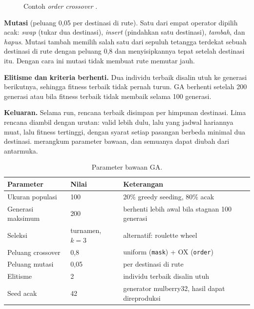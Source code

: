 \begin{figure}[H]
\centering
{}
\caption{Contoh \textit{order crossover} \cite{davis1985}.}
\label{fig:ox}
\end{figure}

\textbf{Mutasi} (peluang 0,05 per destinasi di rute). Satu dari empat operator dipilih acak: \textit{swap} (tukar dua destinasi), \textit{insert} (pindahkan satu destinasi), \textit{tambah}, dan \textit{hapus}. Mutasi tambah memilih salah satu dari sepuluh tetangga terdekat sebuah destinasi di rute dengan peluang 0,8 dan menyisipkannya tepat setelah destinasi itu. Dengan cara ini mutasi tidak membuat rute memutar jauh.

\textbf{Elitisme dan kriteria berhenti.} Dua individu terbaik disalin utuh ke generasi berikutnya, sehingga fitness terbaik tidak pernah turun. GA berhenti setelah 200 generasi atau bila fitness terbaik tidak membaik selama 100 generasi.

\textbf{Keluaran.} Selama run, rencana terbaik disimpan per himpunan destinasi. Lima rencana diambil dengan urutan: valid lebih dulu, lalu yang jadwal hariannya muat, lalu fitness tertinggi, dengan syarat setiap pasangan berbeda minimal dua destinasi.  merangkum parameter bawaan, dan semuanya dapat diubah dari antarmuka.

\begin{table}[H]
\centering
\caption{Parameter bawaan GA.}
\label{tab:parameter}
\small
\begin{tabular}{@{}l l l@{}}
\toprule
\textbf{Parameter} & \textbf{Nilai} & \textbf{Keterangan} \\
\midrule
Ukuran populasi & 100 & 20\% greedy seeding, 80\% acak \\
Generasi maksimum & 200 & berhenti lebih awal bila stagnan 100 generasi \\
Seleksi & turnamen, $k = 3$ & alternatif: roulette wheel \\
Peluang crossover & 0,8 & uniform (\texttt{mask}) + OX (\texttt{order}) \\
Peluang mutasi & 0,05 & per destinasi di rute \\
Elitisme & 2 & individu terbaik disalin utuh \\
Seed acak & 42 & generator mulberry32, hasil dapat direproduksi \\
\bottomrule
\end{tabular}
\end{table}

